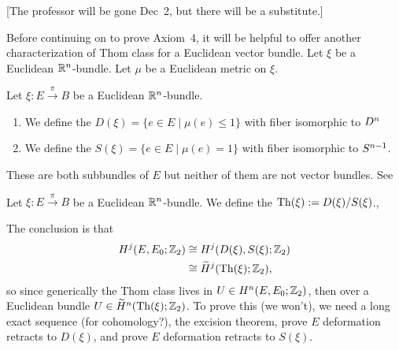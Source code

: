 
\lecture{}

[The professor will be gone Dec~2, but there will be a substitute.]

\begin{node}
Before continuing on to prove Axiom~4, it will be helpful to offer
another characterization of Thom class for a Euclidean vector
bundle. Let $\xi$ be a Euclidean $\mathbb{R}^{n}$-bundle. Let $\mu$ be a
Euclidean metric on $\xi$.
\end{node}

\begin{definition}
Let $\xi\colon E\xrightarrow{\pi}B$ be a Euclidean $\mathbb{R}^{n}$-bundle.
\begin{enumerate}
\item We define the  $D(\xi)=\{e\in E\mid\mu(e)\leq1\}$
with fiber isomorphic to $D^{n}$
\item We define the  $S(\xi)=\{e\in E\mid\mu(e)=1\}$
with fiber isomorphic to $S^{n-1}$.
\end{enumerate}
These are both subbundles of $E$ but neither of them are not vector bundles.
See~\cite[Ch~17~Def~10.1]{husemoller1993fibre}
\end{definition}

\begin{definition}
Let $\xi\colon E\xrightarrow{\pi}B$ be a Euclidean $\mathbb{R}^{n}$-bundle.
We define the  $\operatorname{Th}(\xi):=D(\xi)/S(\xi)$.,
\end{definition}

\begin{node}
The conclusion is that 
\begin{subequations}
  \begin{align}
H^{j}(E,E_{0};\mathbb{Z}_{2})
&\cong H^{j}(D(\xi),S(\xi);\mathbb{Z}_{2})\\
&\cong\widetilde{H}^{j}(\operatorname{Th}(\xi);\mathbb{Z}_{2}),
  \end{align}
\end{subequations}
so since generically the Thom class lives in $U\in H^{n}(E,E_{0};\mathbb{Z}_{2})$,
then over a Euclidean bundle $U\in\widetilde{H}^{n}(\operatorname{Th}(\xi);\mathbb{Z}_{2})$.
To prove this (we won't), we need a long exact sequence (for cohomology?),
the excision theorem, prove $E$ deformation retracts to $D(\xi)$, and
prove $E$ deformation retracts to $S(\xi)$.
\end{node}

